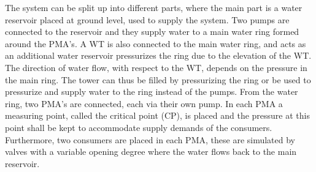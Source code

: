 The system can be split up into different parts, where the main part is a water reservoir placed at ground level, used to supply the system. Two pumps are connected to the reservoir and they supply water to a main water ring formed around the PMA's. 
A WT is also connected to the main water ring, and acts as an additional water reservoir pressurizes the ring due to the elevation of the WT. The direction of water flow, with respect to the WT, depends on the pressure in the main ring. The tower can thus be filled by pressurizing the ring or be used to pressurize and supply water to the ring instead of the pumps.  
From the water ring, two PMA's are connected, each via their own pump. In each PMA a measuring point, called the critical point (CP), is placed and the pressure at this point shall be kept to accommodate supply demands of the consumers. Furthermore, two consumers are placed in each PMA, these are simulated by valves with a variable opening degree where the water flows back to the main reservoir.    

	
